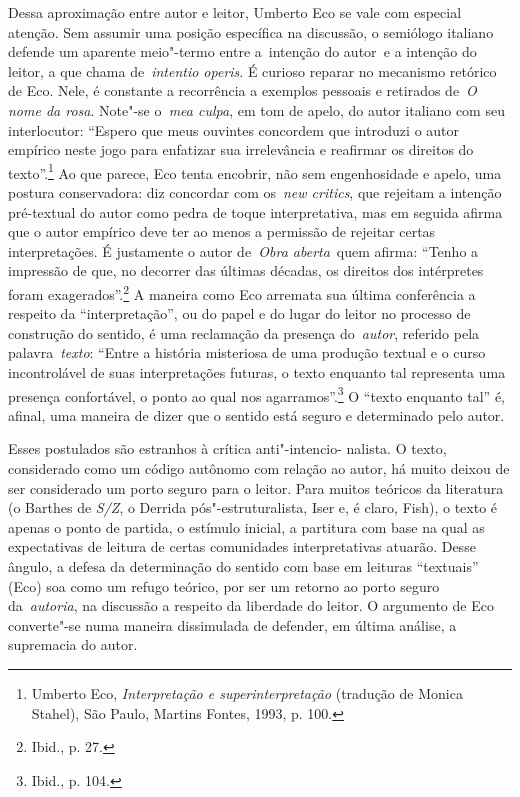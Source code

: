 Dessa aproximação entre autor e leitor, Umberto Eco se vale com especial
atenção. Sem assumir uma posição específica na discussão, o semiólogo
italiano defende um aparente meio"-termo entre a~intenção do
autor\emph{~}e a intenção do leitor, a que chama de~\emph{intentio
operis}. É curioso reparar no mecanismo retórico de Eco. Nele, é
constante a recorrência a exemplos pessoais e retirados de~\emph{O nome
da rosa}. Note"-se o\emph{~mea culpa}, em tom de apelo, do autor italiano
com seu interlocutor: ``Espero que meus ouvintes concordem que introduzi
o autor empírico neste jogo para enfatizar sua irrelevância e reafirmar
os direitos do texto''.\footnote{Umberto Eco, \emph{Interpretação e
  superinterpretação} (tradução de Monica Stahel), São Paulo, Martins
  Fontes, 1993, p. 100.} Ao que parece, Eco tenta encobrir, não sem
engenhosidade e apelo, uma postura conservadora: diz concordar com
os~\emph{new critics}, que rejeitam a intenção pré-textual do autor como
pedra de toque interpretativa, mas em seguida afirma que o autor
empírico deve ter ao menos a permissão de rejeitar certas
interpretações. É justamente o autor de\emph{~Obra aberta}~quem afirma:
``Tenho a impressão de que, no decorrer das últimas décadas, os direitos
dos intérpretes foram exagerados''.\footnote{Ibid., p. 27.} A maneira
como Eco arremata sua última conferência a respeito da
``interpretação'', ou do papel e do lugar do leitor no processo de
construção do sentido, é uma reclamação da presença do~\emph{autor},
referido pela palavra~\emph{texto}: ``Entre a história misteriosa de uma
produção textual e o curso incontrolável de suas interpretações futuras,
o texto enquanto tal representa uma presença confortável, o ponto ao
qual nos agarramos''.\footnote{Ibid., p. 104.} O ``texto enquanto tal''
é, afinal, uma maneira de dizer que o sentido está seguro e determinado
pelo autor.

Esses postulados são estranhos à crítica anti"-intencio- nalista. O texto, considerado como um código autônomo com relação ao autor, há muito deixou de ser considerado um porto seguro para o leitor. Para muitos
teóricos da literatura (o Barthes de \emph{S/Z}, o Derrida
pós"-estruturalista, Iser e, é claro, Fish), o texto é apenas o ponto de
partida, o estímulo inicial, a partitura com base na qual as
expectativas de leitura de certas comunidades interpretativas atuarão.
Desse ângulo, a defesa da determinação do sentido com base em leituras
``textuais'' (Eco) soa como um refugo teórico, por ser um retorno ao
porto seguro da~\emph{autoria}, na discussão a respeito da liberdade do
leitor. O argumento de Eco converte"-se numa maneira dissimulada de
defender, em última análise, a supremacia do autor.

